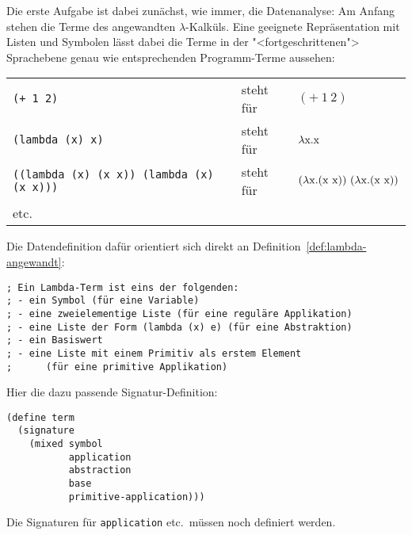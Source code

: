 Die erste Aufgabe ist dabei zunächst, wie immer, die Datenanalyse: Am
Anfang stehen die Terme des angewandten $\lambda$-Kalküls.  Eine
geeignete Repräsentation mit Listen und Symbolen lässt dabei die Terme
in der "<fortgeschrittenen"> Sprachebene genau wie entsprechenden
Programm-Terme aussehen:

\noindent\begin{tabular}{lll}
  \texttt{(+ 1 2)} & steht für & $(+~1~2)$\\
  \texttt{(lambda (x) x)} & steht für & $\lambda \mathrm x.\mathrm x$\\
  \texttt{((lambda (x) (x x)) (lambda (x) (x x)))} & steht für &
  $(\lambda \mathrm x.(\mathrm x~\mathrm x))~(\lambda \mathrm x.(\mathrm x~\mathrm x))$\\
  etc.
\end{tabular}

Die Datendefinition dafür orientiert sich direkt an
Definition~\ref{def:lambda-angewandt}:
%
\begin{lstlisting}
; Ein Lambda-Term ist eins der folgenden:
; - ein Symbol (für eine Variable)
; - eine zweielementige Liste (für eine reguläre Applikation)
; - eine Liste der Form (lambda (x) e) (für eine Abstraktion)
; - ein Basiswert
; - eine Liste mit einem Primitiv als erstem Element
;      (für eine primitive Applikation)
\end{lstlisting}
%
Hier die dazu passende Signatur-Definition:
%
\begin{lstlisting}
(define term
  (signature
    (mixed symbol
           application
           abstraction
           base
           primitive-application)))
\end{lstlisting}
%
Die Signaturen für \lstinline{application} etc.\ müssen noch definiert
werden.


